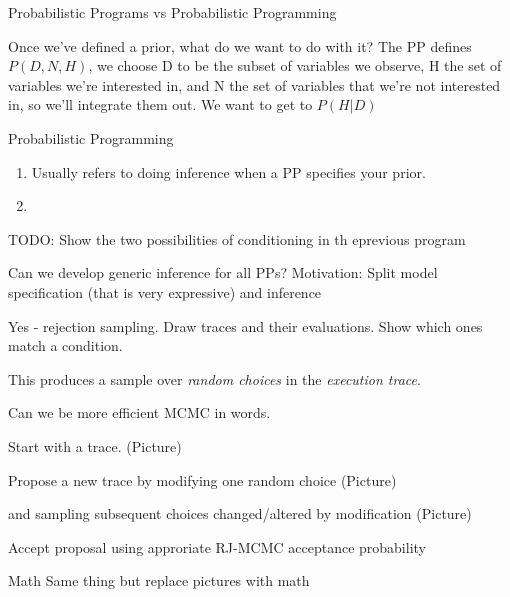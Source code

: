 \begin{frame}{Probabilistic Programs vs Probabilistic Programming}
  \begin{block}{Once we've defined a prior, what do we want to do with it?}  
  The PP defines $P(D,N,H)$, we choose D to be the subset of variables we observe, H the set of variables we're interested in, and N the set of variables that we're not interested in, so we'll integrate them out.  We want to get to $P(H|D)$
  \end{block}
      \begin{block}{Probabilistic Programming}
      \begin{enumerate}
        \item Usually refers to doing inference when a PP specifies your prior.
        \item 
      \end{enumerate}
    \end{block}
    TODO: Show the two possibilities of conditioning in th eprevious program
\end{frame}

\begin{frame}{Can we develop generic inference for all PPs?}
Motivation: Split model specification (that is very expressive) and inference

Yes - rejection sampling. Draw  traces and their evaluations. Show which ones match a condition.

This produces a sample over \emph{random choices} in the \emph{execution trace}.
\end{frame}

\begin{frame}{Can we be more efficient}
MCMC in words.

Start with a trace. (Picture)

Propose a new trace by modifying one random choice (Picture)

and sampling subsequent choices changed/altered by modification (Picture)

Accept proposal using approriate RJ-MCMC acceptance probability

\end{frame}

\begin{frame}{Math}
Same thing but replace pictures with math
\end{frame}

